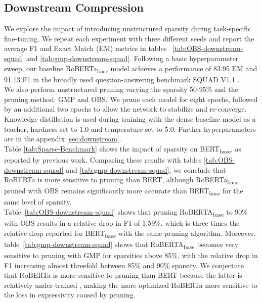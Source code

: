 \subsection{Downstream Compression}
We explore the impact of introducing unstructured sparsity during task-specific fine-tuning. We repeat each experiment with three different seeds and report the average F1 and Exact Match (EM) metrics in tables ~\ref{tab:OBS-downstream-squad} and \ref{tab:gmp-downstream-squad}. Following a basic hyperparameter sweep, our baseline RoBERTa\textsubscript{base} model achieves a performance of 83.95 EM and 91.13 F1 in the broadly used question-answering benchmark SQUAD V1.1 \cite{Rajpurkar2016SQuAD10}. \\
We also perform unstructured pruning varying the sparsity 50-95\% and the pruning method: GMP and OBS. We prune each model for eight epochs, followed by an additional two epochs to allow the network to stabilize and re-converge. Knowledge distillation is used during training with the dense baseline model as a teacher, hardness set to $1.0$ and temperature set to $5.0$.  Further hyperparameters are in the appendix \ref{sec:downstream}.\\
Table \ref{tab:Sparse-Benchmark} shows the impact of sparsity on BERT\textsubscript{base}, as reported by previous work. Comparing these results with tables \ref{tab:OBS-downstream-squad} and \ref{tab:gmp-downstream-squad}, we conclude that RoBERTa is more sensitive to pruning than BERT, although RoBERTa\textsubscript{base} pruned with OBS remains significantly more accurate than BERT\textsubscript{base} for the same level of sparsity.\\
Table~\ref{tab:OBS-downstream-squad} shows that pruning RoBERTA\textsubscript{base} to 90\% with OBS results in a relative drop in F1 of 1.59\%, which is three times the relative drop reported for BERT\textsubscript{base} with the same pruning algorithm.
Moreover, table~\ref{tab:gmp-downstream-squad} shows that RoBERTA\textsubscript{base} becomes very sensitive to pruning with GMP for sparsities above 85\%, with the relative drop in F1 increasing almost threefold between 85\% and 90\% sparsity.
We conjecture that RoBERTa is more sensitive to pruning than BERT because the latter is relatively under-trained \cite{Liu2019RoBERTaAR}, making the more optimized RoBERTa more sensitive to the loss in expressivity caused by pruning.
